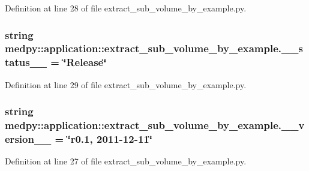 Definition at line 28 of file extract\_\-sub\_\-volume\_\-by\_\-example.py.

\hypertarget{namespacemedpy_1_1application_1_1extract__sub__volume__by__example_a9b87631413f2441b40f8c2e7a8571f19}{
\subsubsection[{\_\-\_\-status\_\-\_\-}]{\setlength{\rightskip}{0pt plus 5cm}string {\bf medpy::application::extract\_\-sub\_\-volume\_\-by\_\-example.\_\-\_\-status\_\-\_\-} = \char`\"{}Release\char`\"{}}}
\label{namespacemedpy_1_1application_1_1extract__sub__volume__by__example_a9b87631413f2441b40f8c2e7a8571f19}


Definition at line 29 of file extract\_\-sub\_\-volume\_\-by\_\-example.py.

\hypertarget{namespacemedpy_1_1application_1_1extract__sub__volume__by__example_af1ac94064e9c2da48f42912d6a55f0e7}{
\subsubsection[{\_\-\_\-version\_\-\_\-}]{\setlength{\rightskip}{0pt plus 5cm}string {\bf medpy::application::extract\_\-sub\_\-volume\_\-by\_\-example.\_\-\_\-version\_\-\_\-} = \char`\"{}r0.1, 2011-\/12-\/11\char`\"{}}}
\label{namespacemedpy_1_1application_1_1extract__sub__volume__by__example_af1ac94064e9c2da48f42912d6a55f0e7}


Definition at line 27 of file extract\_\-sub\_\-volume\_\-by\_\-example.py.

